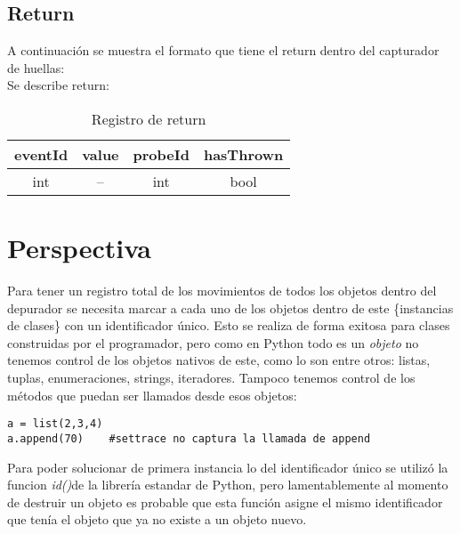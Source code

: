 \documentclass[10pt,a4paper]{article}
\begin{document}
\subsection{Return}

A continuación se muestra el formato que tiene el return dentro del capturador de huellas:\\

Se describe return:\\

\begin{table}[!h]
\begin{center}
\begin{tabular}{| c | c | c | c |}
\hline
eventId & value & probeId & hasThrown \\
\hline
int & --\footnotemark[1] & int & bool\\
\hline
\end{tabular}
\caption{Registro de return} 
\end{center}
\end{table}


\newpage
\section{Perspectiva}

Para tener un registro total de los movimientos de todos los objetos dentro del depurador se necesita marcar a cada uno de los objetos dentro de este \{instancias de clases\} con un identificador único.  Esto se realiza de forma exitosa para clases construidas por el programador, pero como en Python todo es un \textit{objeto} no tenemos control de los objetos nativos de este, como lo son entre otros: listas, tuplas, enumeraciones, strings, iteradores.  Tampoco tenemos control de los métodos que puedan ser llamados desde esos objetos:
\begin{verbatim}
a = list(2,3,4)
a.append(70)    #settrace no captura la llamada de append
\end{verbatim}

Para poder solucionar de primera instancia lo del identificador único se utilizó la funcion \textit{id()}\cite{id}de la librería estandar de Python, pero lamentablemente al momento de destruir un objeto es probable que esta función asigne el mismo identificador que tenía el objeto que ya no existe a un objeto nuevo.\\
\end{document}
